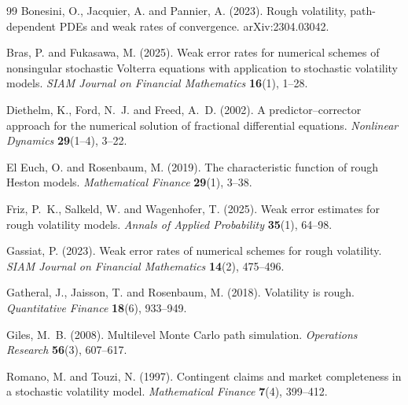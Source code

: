 \documentclass{siamonline250211}
\begin{document}
\begin{thebibliography}{99}
 Bonesini, O., Jacquier, A. and Pannier, A. (2023).
Rough volatility, path-dependent PDEs and weak rates of convergence.
arXiv:2304.03042.

 Bras, P. and Fukasawa, M. (2025).
Weak error rates for numerical schemes of nonsingular stochastic Volterra
equations with application to stochastic volatility models.
\emph{SIAM Journal on Financial Mathematics} \textbf{16}(1), 1--28.

 Diethelm, K., Ford, N.~J. and Freed, A.~D. (2002).
A predictor--corrector approach for the numerical solution of fractional differential
equations. \emph{Nonlinear Dynamics} \textbf{29}(1--4), 3--22.

 El Euch, O. and Rosenbaum, M. (2019).
The characteristic function of rough Heston models.
\emph{Mathematical Finance} \textbf{29}(1), 3--38.

 Friz, P.~K., Salkeld, W. and Wagenhofer, T. (2025).
Weak error estimates for rough volatility models.
\emph{Annals of Applied Probability} \textbf{35}(1), 64--98.

 Gassiat, P. (2023).
Weak error rates of numerical schemes for rough volatility.
\emph{SIAM Journal on Financial Mathematics} \textbf{14}(2), 475--496.

 Gatheral, J., Jaisson, T. and Rosenbaum, M. (2018).
Volatility is rough. \emph{Quantitative Finance} \textbf{18}(6), 933--949.

 Giles, M.~B. (2008).
Multilevel Monte Carlo path simulation.
\emph{Operations Research} \textbf{56}(3), 607--617.

 Romano, M. and Touzi, N. (1997).
Contingent claims and market completeness in a stochastic volatility model.
\emph{Mathematical Finance} \textbf{7}(4), 399--412.

\end{thebibliography}
\end{document}
